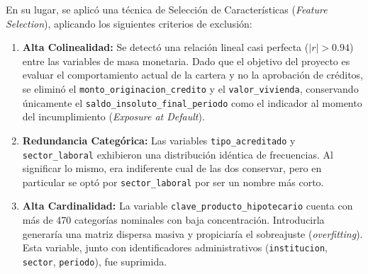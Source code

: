 En su lugar, se aplicó una técnica de Selección de Características (\textit{Feature Selection}), aplicando los siguientes criterios de exclusión:
\begin{enumerate}
	\item \textbf{Alta Colinealidad:} Se detectó una relación lineal casi perfecta ($|r| > 0.94$) entre las variables de masa monetaria. Dado que el objetivo del proyecto es evaluar el comportamiento actual de la cartera y no la aprobación de créditos, se eliminó el \texttt{monto\_originacion\_credito} y el \texttt{valor\_vivienda}, conservando únicamente el \texttt{saldo\_insoluto\_final\_periodo} como el indicador al momento del incumplimiento (\textit{Exposure at Default}).
	\item \textbf{Redundancia Categórica:} Las variables \texttt{tipo\_acreditado} y \texttt{sector\_laboral} exhibieron una distribución idéntica de frecuencias. Al significar lo mismo, era indiferente cual de las dos conservar, pero en particular se optó por \texttt{sector\_laboral} por ser un nombre más corto.
	\item \textbf{Alta Cardinalidad:} La variable \texttt{clave\_producto\_hipotecario} cuenta con más de 470 categorías nominales con baja concentración. Introducirla generaría una matriz dispersa masiva y propiciaría el sobreajuste (\textit{overfitting}). Esta variable, junto con identificadores administrativos (\texttt{institucion}, \texttt{sector}, \texttt{periodo}), fue suprimida.
\end{enumerate}